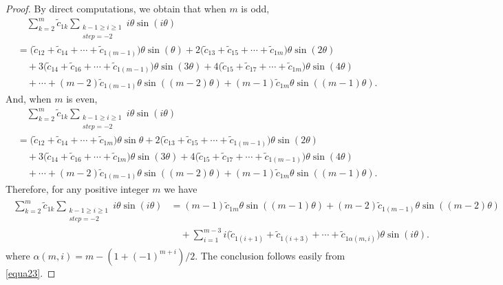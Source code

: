 \documentclass[11pt]{amsart}
\theoremstyle{remark}
\theoremstyle{definition}
\begin{document}
\begin{proof}
By direct computations,  we obtain that when $m$ is odd,
\begin{equation*}\label{equa21}\begin{split}
&\quad \sum_{k=2}^{m}\tilde{c}_{1k}\sum_{\substack{k-1\geq i\geq 1\\ step=-2}}i\theta\sin(i\theta)\\
&=\big(\tilde{c}_{12}+\tilde{c}_{14}+\cdots+\tilde{c}_{1(m-1)}\big)\theta\sin(\theta)+2\big(\tilde{c}_{13}+\tilde{c}_{15}+\cdots+\tilde{c}_{1m}\big)\theta\sin(2\theta)\\
&\quad +3\big(\tilde{c}_{14}+\tilde{c}_{16}+\cdots+\tilde{c}_{1(m-1)}\big)\theta\sin(3\theta)+4\big(\tilde{c}_{15}+\tilde{c}_{17}+\cdots+\tilde{c}_{1m}\big)\theta\sin(4\theta)\\
&\quad +\cdots+(m-2)\tilde{c}_{1(m-1)}\theta\sin((m-2)\theta)+(m-1)\tilde{c}_{1m}\theta\sin((m-1)\theta).
\end{split}
\end{equation*}
And, when  $m$ is even,
\begin{equation*}\label{equa22}\begin{split}
&\quad \sum_{k=2}^{m}\tilde{c}_{1k}\sum_{\substack{k-1\geq i\geq 1\\ step=-2}}i\theta\sin(i\theta)\\
&=\big(\tilde{c}_{12}+\tilde{c}_{14}+\cdots+\tilde{c}_{1m}\big)\theta\sin\theta+2\big(\tilde{c}_{13}+\tilde{c}_{15}+\cdots+\tilde{c}_{1(m-1)}\big)\theta\sin(2\theta)\\
&\quad +3\big(\tilde{c}_{14}+\tilde{c}_{16}+\cdots+\tilde{c}_{1m}\big)\theta\sin(3\theta)+4\big(\tilde{c}_{15}+\tilde{c}_{17}+\cdots+\tilde{c}_{1(m-1)}\big)\theta\sin(4\theta)\\
&\quad +\cdots +(m-2)\tilde{c}_{1(m-1)}\theta\sin((m-2)\theta) +(m-1)\tilde{c}_{1m}\theta\sin((m-1)\theta).
\end{split}
\end{equation*}
Therefore, for any positive integer $m$ we have
\begin{align}\label{equa23}\begin{split}
\sum_{k=2}^{m}\tilde{c}_{1k}\sum_{\substack{k-1\geq i\geq 1\\ step=-2}}i\theta\sin(i\theta)&=(m-1)\tilde{c}_{1m}\theta\sin((m-1)\theta)+(m-2)\tilde{c}_{1(m-1)}\theta\sin((m-2)\theta)\\
&\quad +\sum_{i=1}^{m-3}i\bigg(\tilde{c}_{1(i+1)}+\tilde{c}_{1(i+3)}+\cdots+\tilde{c}_{1\alpha(m,i)}\bigg)\theta\sin(i\theta).
\end{split}
\end{align}
where $\alpha(m,i)=m-(1+(-1)^{m+i})/2$.  The conclusion follows easily from \eqref{equa23}.
\end{proof}
\end{document}
